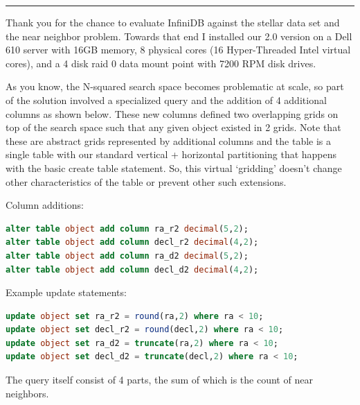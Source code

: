 \documentclass[DM,lsstdraft,toc]{lsstdoc}
\begin{document}
\begin{center}\rule{0.5\linewidth}{\linethickness}\end{center}

Thank you for the chance to evaluate InfiniDB against the stellar data
set and the near neighbor problem. Towards that end I installed our 2.0
version on a Dell 610 server with 16GB memory, 8 physical cores (16
Hyper-Threaded Intel virtual cores), and a 4 disk raid 0 data mount
point with 7200 RPM disk drives.

As you know, the N-squared search space becomes problematic at scale, so
part of the solution involved a specialized query and the addition of 4
additional columns as shown below. These new columns defined two
overlapping grids on top of the search space such that any given object
existed in 2 grids. Note that these are abstract grids represented by
additional columns and the table is a single table with our standard
vertical + horizontal partitioning that happens with the basic create
table statement. So, this virtual `gridding' doesn't change other
characteristics of the table or prevent other such extensions.

Column additions:

\begin{lstlisting}[language=SQL]
alter table object add column ra_r2 decimal(5,2);
alter table object add column decl_r2 decimal(4,2);
alter table object add column ra_d2 decimal(5,2);
alter table object add column decl_d2 decimal(4,2);
\end{lstlisting}

Example update statements:

\begin{lstlisting}[language=SQL]
update object set ra_r2 = round(ra,2) where ra < 10;
update object set decl_r2 = round(decl,2) where ra < 10;
update object set ra_d2 = truncate(ra,2) where ra < 10;
update object set decl_d2 = truncate(decl,2) where ra < 10;
\end{lstlisting}

The query itself consist of 4 parts, the sum of which is the count of
near neighbors.
\end{document}
